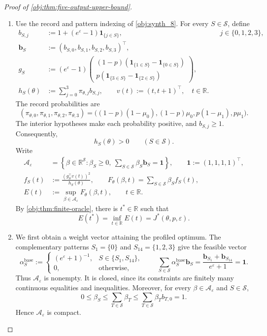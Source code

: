\begin{proof}[Proof of \cref{obj:thm:five-output-upper-bound}]
\begin{enumerate}
\item
Use the record and pattern indexing of \cref{obj:synth_8}. For every \(S\in\mathcal S\), define
\[
\begin{aligned}
b_{S,j}
&:=1+(e^\varepsilon-1)\mathbf 1_{\{j\in S\}},
&&j\in\{0,1,2,3\},\\
\mathbf b_S&:=(b_{S,0},b_{S,1},b_{S,2},b_{S,3})^\top,\\
g_S
&:=(e^\varepsilon-1)
\begin{pmatrix}
(1-p)(\mathbf 1_{\{1\in S\}}-\mathbf 1_{\{0\in S\}})\\
p(\mathbf 1_{\{3\in S\}}-\mathbf 1_{\{2\in S\}})
\end{pmatrix},\\
h_S(\theta)&:=\sum_{j=0}^{3}\pi_{\theta,j}b_{S,j},
\qquad
v(t):=(t,t+1)^\top,\quad t\in\mathbb R.
\end{aligned}
\]
The record probabilities are
\[
(\pi_{\theta,0},\pi_{\theta,1},\pi_{\theta,2},\pi_{\theta,3})
=
\bigl((1-p)(1-\mu_0),(1-p)\mu_0,
p(1-\mu_1),p\mu_1\bigr).
\]
The interior hypotheses make each probability positive, and
\(b_{S,j}\ge1\). Consequently,
\[
h_S(\theta)>0\qquad(S\in\mathcal S).
\]
Write
\[
\begin{aligned}
\mathcal A_\varepsilon
&=\left\{\beta\in\mathbb R^{\mathcal S}:
\beta_S\ge0,\ 
\sum_{S\in\mathcal S}\beta_S\mathbf b_S=\mathbf1
\right\},
\qquad \mathbf1:=(1,1,1,1)^\top,\\
f_S(t)&:=\frac{(g_S^\top v(t))^2}{h_S(\theta)},
\qquad
F_\theta(\beta,t)=\sum_{S\in\mathcal S}\beta_Sf_S(t),\\
E(t)&:=\sup_{\beta\in\mathcal A_\varepsilon}F_\theta(\beta,t),
\qquad t\in\mathbb R.
\end{aligned}
\]
By \cref{obj:thm:finite-oracle}, there is \(t^*\in\mathbb R\) such that
\[
E(t^*)=\inf_{t\in\mathbb R}E(t)
=J^*(\theta,p,\varepsilon).
\]

\item
We first obtain a weight vector attaining the profiled optimum.
The complementary patterns \(S_1=\{0\}\) and \(S_{14}=\{1,2,3\}\)
give the feasible vector
\[
\alpha^{\mathrm{base}}_S:=
\begin{cases}
(e^\varepsilon+1)^{-1},&S\in\{S_1,S_{14}\},\\
0,&\text{otherwise},
\end{cases}
\qquad
\sum_{S\in\mathcal S}\alpha^{\mathrm{base}}_S\mathbf b_S
=
\frac{\mathbf b_{S_1}+\mathbf b_{S_{14}}}{e^\varepsilon+1}
=\mathbf1.
\]
Thus \(\mathcal A_\varepsilon\) is nonempty. It is closed, since its
constraints are finitely many continuous equalities and inequalities.
Moreover, for every \(\beta\in\mathcal A_\varepsilon\) and \(S\in\mathcal S\),
\[
0\le\beta_S
\le\sum_{T\in\mathcal S}\beta_T
\le\sum_{T\in\mathcal S}\beta_Tb_{T,0}
=1.
\]
Hence \(\mathcal A_\varepsilon\) is compact.


\end{enumerate}
\end{proof}
